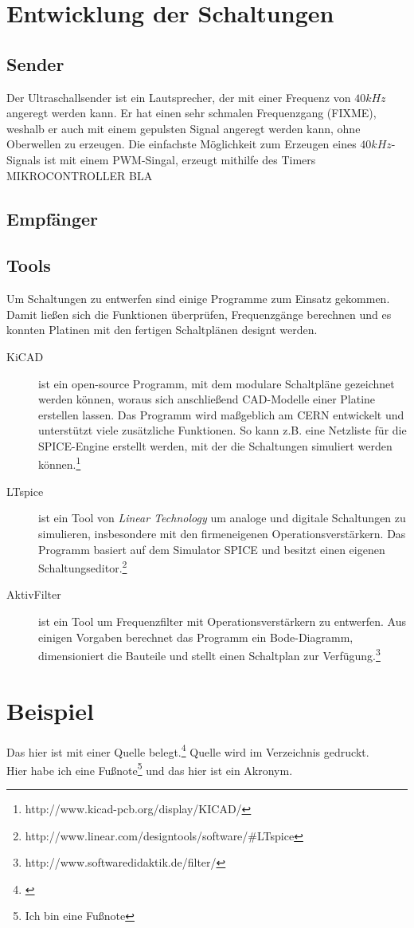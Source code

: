 

\chapter{Entwicklung der Schaltungen}



\section{Sender}
Der Ultraschallsender ist ein Lautsprecher, der mit einer Frequenz von $40kHz$ angeregt werden kann. Er hat einen sehr schmalen Frequenzgang (FIXME), weshalb er auch mit einem gepulsten Signal angeregt werden kann, ohne Oberwellen zu erzeugen. Die einfachste Möglichkeit zum Erzeugen eines $40kHz$-Signals ist mit einem \ac{PWM}-Singal, erzeugt mithilfe des Timers MIKROCONTROLLER BLA


\section{Empfänger}


\section{Tools}
Um Schaltungen zu entwerfen sind einige Programme zum Einsatz gekommen. Damit ließen sich die Funktionen überprüfen, Frequenzgänge berechnen und es konnten Platinen mit den fertigen Schaltplänen designt werden.
\begin{description}
	\item[KiCAD] ist ein open-source Programm, mit dem modulare Schaltpläne gezeichnet werden können, woraus sich anschließend CAD-Modelle einer Platine erstellen lassen. Das Programm wird maßgeblich am CERN entwickelt und unterstützt viele zusätzliche Funktionen. So kann z.B. eine Netzliste für die \ac{SPICE}-Engine erstellt werden, mit der die Schaltungen simuliert werden können.\footnote{http://www.kicad-pcb.org/display/KICAD/}
	\item[LTspice] ist ein Tool von \textit{Linear Technology} um analoge und digitale Schaltungen zu simulieren, insbesondere mit den firmeneigenen Operationsverstärkern. Das Programm basiert auf dem Simulator \ac{SPICE} und besitzt einen eigenen Schaltungseditor.\footnote{http://www.linear.com/designtools/software/\#LTspice}
	\item[AktivFilter] ist ein Tool um Frequenzfilter mit Operationsverstärkern zu entwerfen. Aus einigen Vorgaben berechnet das Programm ein Bode-Diagramm, dimensioniert die Bauteile und stellt einen Schaltplan zur Verfügung.\footnote{http://www.softwaredidaktik.de/filter/}
\end{description}


\newpage

\chapter*{Beispiel}

Das hier ist mit einer Quelle belegt.\footnote{\cite[42]{baumgartner:2002}} Quelle wird im Verzeichnis gedruckt.\\
Hier habe ich eine Fußnote\footnote{Ich bin eine Fußnote} und das hier ist ein \ac{Akronym}.
